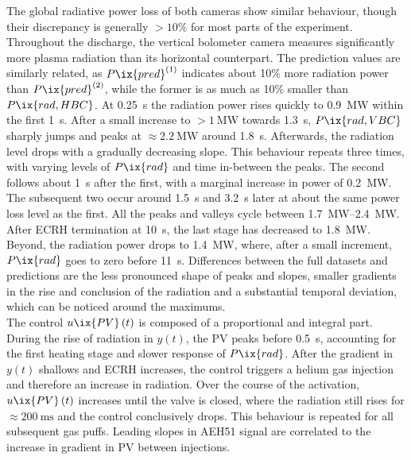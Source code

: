             The global radiative power loss of both cameras show similar behaviour, though their discrepancy is generally $>10\%$ for most parts of the experiment. Throughout the discharge, the vertical bolometer camera measures significantly more plasma radiation than its horizontal counterpart. The prediction values are similarly related, as $P\ix{pred}^{\left(1\right)}$ indicates about 10\% more radiation power than $P\ix{pred}^{\left(2\right)}$, while the former is as much as 10\% smaller than $P\ix{rad, HBC}$. At \SI{0.25}{\second} the radiation power rises quickly to \SI{0.9}{\mega\watt} within the first \SI{1}{\second}. After a small increase to $>\SI{1}{\mega\watt}$ towards \SI{1.3}{\second}, $P\ix{rad, VBC}$ sharply jumps and peaks at $\approx\SI{2.2}{\mega\watt}$ around \SI{1.8}{\second}. Afterwards, the radiation level drops with a gradually decreasing slope. This behaviour repeats three times, with varying levels of $P\ix{rad}$ and time in-between the peaks. The second follows about \SI{1}{\second} after the first, with a marginal increase in power of \SI{0.2}{\mega\watt}. The subsequent two occur around \SI{1.5}{\second} and \SI{3.2}{\second} later at about the same power loss level as the first. All the peaks and valleys cycle between \SIrange{1.7}{2.4}{\mega\watt}. After ECRH termination at \SI{10}{\second}, the last stage has decreased to \SI{1.8}{\mega\watt}. Beyond, the radiation power drops to \SI{1.4}{\mega\watt}, where, after a small increment, $P\ix{rad}$ goes to zero before \SI{11}{\second}. Differences between the full datasets and predictions are the less pronounced shape of peaks and slopes, smaller gradients in the rise and conclusion of the radiation and a substantial temporal deviation, which can be noticed around the maximums.\\%
            The control $u\ix{PV}\left(t\right)$ is composed of a proportional and integral part. During the rise of radiation in $y\left(t\right)$, the PV peaks before \SI{0.5}{\second}, accounting for the first heating stage and slower response of $P\ix{rad}$. After the gradient in $y\left(t\right)$ shallows and ECRH increases, the control triggers a helium gas injection and therefore an increase in radiation. Over the course of the activation, $u\ix{PV}\left(t\right)$ increases until the valve is closed, where the radiation still rises for $\approx\SI{200}{\milli\second}$ and the control conclusively drops. This behaviour is repeated for all subsequent gas puffs. Leading slopes in AEH51 signal are correlated to the increase in gradient in PV between injections.\\%
